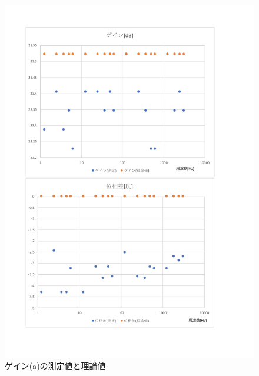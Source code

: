 \documentclass[uplatex, 11pt,a4j, titlepage]{jsarticle}
\begin{document}
\begin{figure}[h]
    \centering
    \includegraphics[width=12cm]{ideal_plot3.pdf}
    \caption{ゲイン(a)の測定値と理論値}
    \label{ideal_plot3}
\end{figure}
\end{document}
